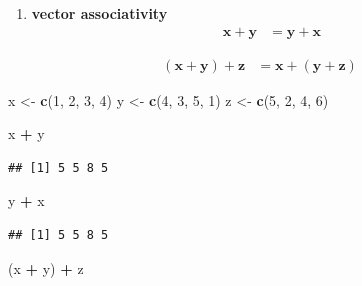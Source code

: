 \documentclass[
]{book}
\newenvironment{Shaded}{\begin{snugshade}}{\end{snugshade}}
\newcommand{\DecValTok}[1]{\textcolor[rgb]{0.00,0.00,0.81}{#1}}
\newcommand{\KeywordTok}[1]{\textcolor[rgb]{0.13,0.29,0.53}{\textbf{#1}}}
\newcommand{\NormalTok}[1]{#1}
\newcommand{\OperatorTok}[1]{\textcolor[rgb]{0.81,0.36,0.00}{\textbf{#1}}}
\newcommand{\StringTok}[1]{\textcolor[rgb]{0.31,0.60,0.02}{#1}}
\providecommand{\tightlist}{%
  \setlength{\itemsep}{0pt}\setlength{\parskip}{0pt}}
\theoremstyle{definition}
\theoremstyle{definition}
\theoremstyle{definition}
\theoremstyle{remark}
\begin{document}
\begin{enumerate}
\def\labelenumi{\arabic{enumi})}
\setcounter{enumi}{4}
\tightlist
\item
  \textbf{vector associativity}
  \[
  \begin{aligned}
  \mathbf{x} + \mathbf{y} & = \mathbf{y} + \mathbf{x}
  \end{aligned}
  \]
\end{enumerate}

\[
\begin{aligned}
(\mathbf{x} + \mathbf{y}) + \mathbf{z} & = \mathbf{x} + (\mathbf{y} + \mathbf{z})
\end{aligned}
\]

\begin{Shaded}
\begin{Highlighting}[]
\NormalTok{x <-}\StringTok{ }\KeywordTok{c}\NormalTok{(}\DecValTok{1}\NormalTok{, }\DecValTok{2}\NormalTok{, }\DecValTok{3}\NormalTok{, }\DecValTok{4}\NormalTok{)}
\NormalTok{y <-}\StringTok{ }\KeywordTok{c}\NormalTok{(}\DecValTok{4}\NormalTok{, }\DecValTok{3}\NormalTok{, }\DecValTok{5}\NormalTok{, }\DecValTok{1}\NormalTok{)}
\NormalTok{z <-}\StringTok{ }\KeywordTok{c}\NormalTok{(}\DecValTok{5}\NormalTok{, }\DecValTok{2}\NormalTok{, }\DecValTok{4}\NormalTok{, }\DecValTok{6}\NormalTok{)}

\NormalTok{x }\OperatorTok{+}\StringTok{ }\NormalTok{y}
\end{Highlighting}
\end{Shaded}

\begin{verbatim}
## [1] 5 5 8 5
\end{verbatim}

\begin{Shaded}
\begin{Highlighting}[]
\NormalTok{y }\OperatorTok{+}\StringTok{ }\NormalTok{x}
\end{Highlighting}
\end{Shaded}

\begin{verbatim}
## [1] 5 5 8 5
\end{verbatim}

\begin{Shaded}
\begin{Highlighting}[]
\NormalTok{(x }\OperatorTok{+}\StringTok{ }\NormalTok{y) }\OperatorTok{+}\StringTok{ }\NormalTok{z}
\end{Highlighting}
\end{Shaded}
\end{document}
